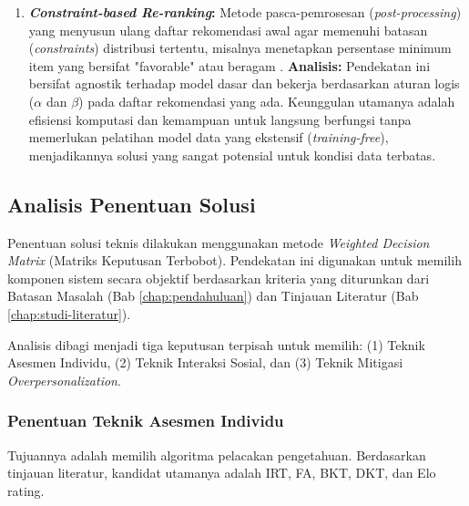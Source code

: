 \begin{enumerate}
    \item \textbf{\textit{Constraint-based Re-ranking}:}
    Metode pasca-pemrosesan (\textit{post-processing}) yang menyusun ulang daftar rekomendasi awal agar memenuhi batasan (\textit{constraints}) distribusi tertentu, misalnya menetapkan persentase minimum item yang bersifat "favorable" atau beragam \autocite{DeBiasio2023}.
    \textbf{Analisis:} Pendekatan ini bersifat agnostik terhadap model dasar dan bekerja berdasarkan aturan logis ($\alpha$ dan $\beta$) pada daftar rekomendasi yang ada. Keunggulan utamanya adalah efisiensi komputasi dan kemampuan untuk langsung berfungsi tanpa memerlukan pelatihan model data yang ekstensif (\textit{training-free}), menjadikannya solusi yang sangat potensial untuk kondisi data terbatas.
\end{enumerate}

\subsection{Analisis Penentuan Solusi}
\label{ssec:analisis_penentuan_solusi}
Penentuan solusi teknis dilakukan menggunakan metode \textit{Weighted Decision Matrix} (Matriks Keputusan Terbobot). Pendekatan ini digunakan untuk memilih komponen sistem secara objektif berdasarkan kriteria yang diturunkan dari Batasan Masalah (Bab \ref{chap:pendahuluan}) dan Tinjauan Literatur (Bab \ref{chap:studi-literatur}).

Analisis dibagi menjadi tiga keputusan terpisah untuk memilih: (1) Teknik Asesmen Individu, (2) Teknik Interaksi Sosial, dan (3) Teknik Mitigasi \textit{Overpersonalization}.

\subsubsection{Penentuan Teknik Asesmen Individu}
\label{sssec:keputusan_asesmen_individu}
Tujuannya adalah memilih algoritma pelacakan pengetahuan. Berdasarkan tinjauan literatur, kandidat utamanya adalah IRT, FA, BKT, DKT, dan Elo rating.




